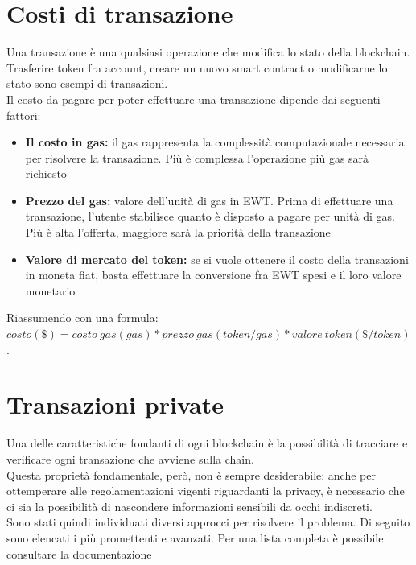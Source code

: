 \documentclass[12pt, letterpaper, twoside]{article}
\begin{document}
\newpage

\section{Costi di transazione}
Una transazione è una qualsiasi operazione che modifica lo stato della blockchain. Trasferire token fra account, creare un nuovo smart contract o modificarne lo stato sono esempi di transazioni. \\
Il costo da pagare per poter effettuare una transazione dipende dai seguenti fattori:

\begin{itemize}
    \item \textbf{Il costo in gas:} il gas rappresenta la complessità computazionale necessaria per risolvere la transazione. Più è complessa l'operazione più gas sarà richiesto
    \item \textbf{Prezzo del gas:} valore dell'unità di gas in EWT. Prima di effettuare una transazione, l'utente stabilisce quanto è disposto a pagare per unità di gas. Più è alta l'offerta, maggiore sarà la priorità della transazione
    \item \textbf{Valore di mercato del token:} se si vuole ottenere il costo della transazioni in moneta fiat, basta effettuare la conversione fra EWT spesi e il loro valore monetario
\end{itemize}

Riassumendo con una formula: \\
$ costo(\$) = costo\ gas(gas) * prezzo\ gas(token/gas) * valore\ token (\$/token) $. \\

\newpage

\section{Transazioni private}
Una delle caratteristiche fondanti di ogni blockchain è la possibilità di tracciare e verificare ogni transazione che avviene sulla chain. \\
Questa proprietà fondamentale, però, non è sempre desiderabile: anche per ottemperare alle regolamentazioni vigenti riguardanti la privacy, è necessario che ci sia la possibilità di nascondere informazioni sensibili da occhi indiscreti. \\
Sono stati quindi individuati diversi approcci per risolvere il problema. 
Di seguito sono elencati i più promettenti e avanzati.
Per una lista completa è possibile consultare la documentazione \cite{wiki:ew-privacy}
\end{document}
